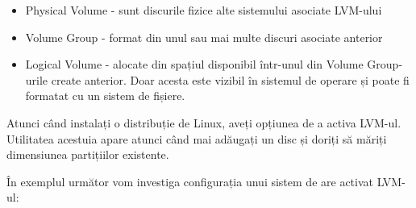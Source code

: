 \begin{itemize}
	\item Physical Volume - sunt discurile fizice alte sistemului asociate LVM-ului
	\item Volume Group - format din unul sau mai multe discuri asociate anterior
	\item Logical Volume - alocate din spațiul disponibil într-unul din
		Volume Group-urile create anterior. Doar acesta este vizibil în
		sistemul de operare și poate fi formatat cu un sistem de
		fișiere.
\end{itemize}

Atunci când instalați o distribuție de Linux, aveți opțiunea de a activa LVM-ul.
Utilitatea acestuia apare atunci când mai adăugați un disc și doriți să măriți
dimensiunea partițiilor existente.

În exemplul următor vom investiga configurația unui sistem de are activat LVM-ul:

